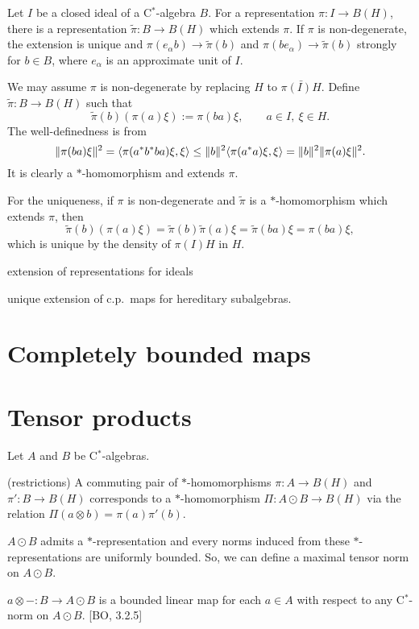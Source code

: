 \documentclass{../../large}
\begin{document}
\begin{prb}
Let $I$ be a closed ideal of a C$^*$-algebra $B$.
For a representation $\pi:I\to B(H)$, there is a representation $\tilde\pi:B\to B(H)$ which extends $\pi$.
If $\pi$ is non-degenerate, the extension is unique and $\pi(e_\alpha b)\to\tilde\pi(b)$ and $\pi(be_\alpha)\to\tilde\pi(b)$ strongly for $b\in B$, where $e_\alpha$ is an approximate unit of $I$.
\end{prb}
\begin{pf}
We may assume $\pi$ is non-degenerate by replacing $H$ to $\bar{\pi(I)H}$.
Define $\tilde\pi:B\to B(H)$ such that
\[\tilde\pi(b)(\pi(a)\xi):=\pi(ba)\xi,\qquad a\in I,\ \xi\in H.\]
The well-definedness is from
\[\|\pi(ba)\xi\|^2=\langle\pi(a^*b^*ba)\xi,\xi\rangle\le\|b\|^2\langle\pi(a^*a)\xi,\xi\rangle=\|b\|^2\|\pi(a)\xi\|^2.\]
It is clearly a $*$-homomorphism and extends $\pi$.

For the uniqueness, if $\pi$ is non-degenerate and $\tilde\pi$ is a $*$-homomorphism which extends $\pi$, then
\[\tilde\pi(b)(\pi(a)\xi)=\tilde\pi(b)\tilde\pi(a)\xi=\tilde\pi(ba)\xi=\pi(ba)\xi,\]
which is unique by the density of $\pi(I)H$ in $H$.
\end{pf}

extension of representations for ideals

unique extension of c.p.~maps for hereditary subalgebras.



\section{Completely bounded maps}




\section{Tensor products}

\begin{prb}
Let $A$ and $B$ be C$^*$-algebras.
\begin{parts}
\item (restrictions) A commuting pair of $*$-homomorphisms $\pi:A\to B(H)$ and $\pi':B\to B(H)$ corresponds to a $*$-homomorphism $\Pi:A\odot B\to B(H)$ via the relation $\Pi(a\otimes b)=\pi(a)\pi'(b)$.
\item $A\odot B$ admits a $*$-representation and every norms induced from these $*$-representations are uniformly bounded. So, we can define a maximal tensor norm on $A\odot B$.
\item $a\otimes-:B\to A\odot B$ is a bounded linear map for each $a\in A$ with respect to any C$^*$-norm on $A\odot B$. [BO, 3.2.5]
\end{parts}
\end{prb}
\end{document}
